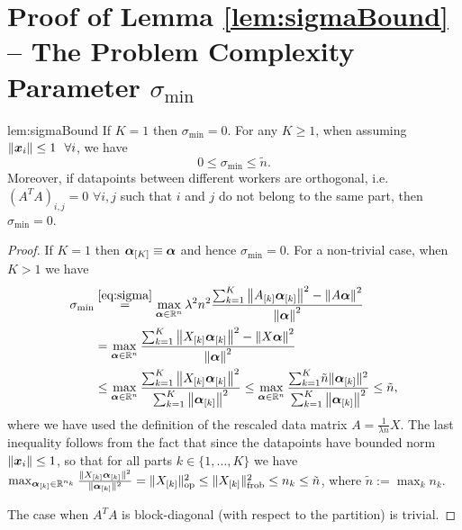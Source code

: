 \documentclass{article} %
\begin{document}
\section{Proof of Lemma \ref{lem:sigmaBound} -- The Problem Complexity Parameter $\sigma_{\min}$}
\begin{replemma}{lem:sigmaBound}
If $K=1$ then $\sigma_{\min}=0$.
For any $K\geq 1$, when assuming $\|\bm{x}_i\|\leq 1 \ \ \forall i$, we have 
\[
0 \le \sigma_{\min} \le \tilde n .
\]
Moreover, if datapoints between different workers are orthogonal, i.e. $(A^TA)_{i,j} = 0$ $\forall i,j$ such that $i$ and $j$ do not belong to the same part, then $\sigma_{\min}=0$.
\end{replemma}
\begin{proof}
 If $K=1$ then $\bm{\alpha}_{[K]}\equiv \bm{\alpha}$ and hence 
$\sigma_{\min}=0$.
For a non-trivial case, when $K>1$ we have
\begin{align*}
\sigma_{\min}
&\overset{\eqref{eq:sigma}}{=}
\max_{\av \in \R^n}
\lambda^2 n^2 %
\frac{ \textstyle{\sum}_{k=1}^K  
  \norm{ A_{[k]}   \av_{[k]} }^2  -
  \norm{ A \av }^2 
   }
   {\norm{ \av }^2}
\\
&=
\max_{\av \in \R^n}
\frac{ \textstyle{\sum}_{k=1}^K  
  \norm{ X_{[k]}   \av_{[k]} }^2  -
  \norm{ X \av }^2 
   }
   {\norm{ \av }^2}
\\
&\leq   
\max_{\av \in \R^n}
\frac{ \textstyle{\sum}_{k=1}^K   
  \norm{  X_{[k]}   \av_{[k]} }^2  
   }
   { \sum_{k=1}^K \norm{    \av_{[k]}   }^2   }
\leq
\max_{\av \in \R^n}
\frac{ \textstyle{\sum}_{k=1}^K   
    \tilde n \|\av_{[k]}\|^2
   }
   { \sum_{k=1}^K \norm{    \av_{[k]}   }^2   }  
   \leq \tilde n, 
\end{align*}
where we have used the definition of the rescaled data matrix $A = \frac{1}{\lambda n} X$.
The last inequality follows from the fact that since the datapoints have bounded 
norm $\|\bm{x}_i\|\leq 1$, so that for all parts $k \in \{1,\dots,K\}$ we have
\\ $
\max_{\bm{\alpha}_{[k]} \in \mathbb{R}^{n_k}} \frac{ \|X_{[k]} \bm{\alpha}_{[k]}\|^2}{\|\bm{\alpha}_{[k]}\|^2} 
= \|X_{[k]}\|_{\text{op}}^2 \leq \|X_{[k]}\|_{\text{frob}}^2
\leq n_k \leq \tilde n
$, where $\tilde n := \max_k n_k$.

The case when $A^TA$ is block-diagonal (with respect to the partition) is trivial.
\end{proof}
 
\end{document}
